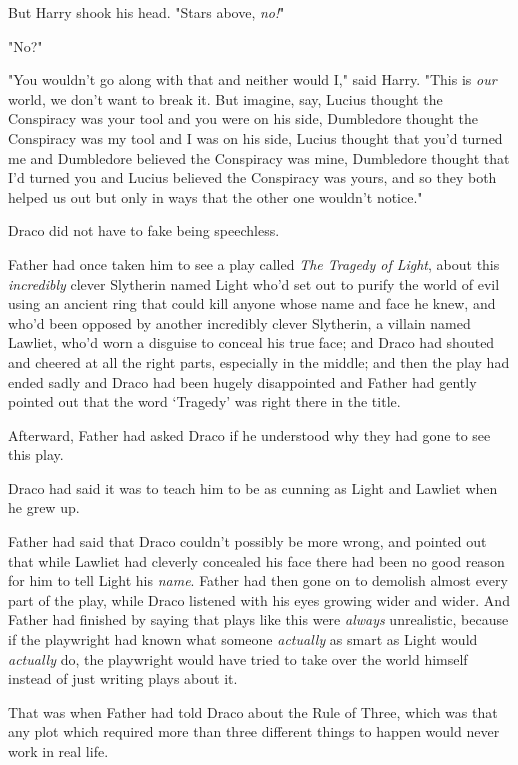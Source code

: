 But Harry shook his head. "Stars above, \emph{no!}"

"No{\el}?"

"You wouldn't go along with that and neither would I," said Harry. "This is
\emph{our} world, we don't want to break it. But imagine, say, Lucius thought
the Conspiracy was your tool and you were on his side, Dumbledore thought the
Conspiracy was my tool and I was on his side, Lucius thought that you'd turned
me and Dumbledore believed the Conspiracy was mine, Dumbledore thought that I'd
turned you and Lucius believed the Conspiracy was yours, and so they both
helped us out but only in ways that the other one wouldn't notice."

Draco did not have to fake being speechless.

Father had once taken him to see a play called \emph{The Tragedy of Light},
about this \emph{incredibly} clever Slytherin named Light who'd set out to
purify the world of evil using an ancient ring that could kill anyone whose
name and face he knew, and who'd been opposed by another incredibly clever
Slytherin, a villain named Lawliet, who'd worn a disguise to conceal his true
face; and Draco had shouted and cheered at all the right parts, especially in
the middle; and then the play had ended sadly and Draco had been hugely
disappointed and Father had gently pointed out that the word `Tragedy' was
right there in the title.

Afterward, Father had asked Draco if he understood why they had gone to see
this play.

Draco had said it was to teach him to be as cunning as Light and Lawliet when
he grew up.

Father had said that Draco couldn't possibly be more wrong, and pointed out
that while Lawliet had cleverly concealed his face there had been no good
reason for him to tell Light his \emph{name}. Father had then gone on to
demolish almost every part of the play, while Draco listened with his eyes
growing wider and wider. And Father had finished by saying that plays like this
were \emph{always} unrealistic, because if the playwright had known what
someone \emph{actually} as smart as Light would \emph{actually} do, the
playwright would have tried to take over the world himself instead of just
writing plays about it.

That was when Father had told Draco about the Rule of Three, which was that any
plot which required more than three different things to happen would never work
in real life.

